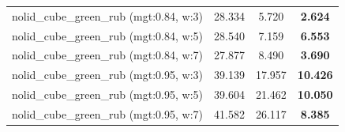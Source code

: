 \begin{table}[H]
{\begin{tabular}{l ccc}
        nolid\_cube\_green\_rub (mgt:0.84, w:3) & 28.334 & 5.720 & \textbf{2.624} \\
        nolid\_cube\_green\_rub (mgt:0.84, w:5) & 28.540 & 7.159 & \textbf{6.553} \\
        nolid\_cube\_green\_rub (mgt:0.84, w:7) & 27.877 & 8.490 & \textbf{3.690} \\
        nolid\_cube\_green\_rub (mgt:0.95, w:3) & 39.139 & 17.957 & \textbf{10.426} \\
        nolid\_cube\_green\_rub (mgt:0.95, w:5) & 39.604 & 21.462 & \textbf{10.050} \\
        nolid\_cube\_green\_rub (mgt:0.95, w:7) & 41.582 & 26.117 & \textbf{8.385} \\
        \bottomrule
    \end{tabular}
    }
\end{table}
